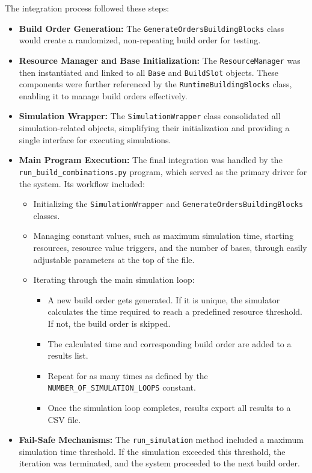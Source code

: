 \documentclass[a4paper, 12pt, english]{article}
\begin{document}
The integration process followed these steps:
\begin{itemize}
    \item \textbf{Build Order Generation:} The \texttt{GenerateOrdersBuildingBlocks} class would create a randomized, non-repeating build order for testing.
    \item \textbf{Resource Manager and Base Initialization:} The \texttt{ResourceManager} was then instantiated and linked to all \texttt{Base} and \texttt{BuildSlot} objects. These components were further referenced by the \texttt{RuntimeBuildingBlocks} class, enabling it to manage build orders effectively.
    \item \textbf{Simulation Wrapper:} The \texttt{SimulationWrapper} class consolidated all simulation-related objects, simplifying their initialization and providing a single interface for executing simulations.
    \item \textbf{Main Program Execution:} The final integration was handled by the \texttt{run\_build\_combinations.py} program, which served as the primary driver for the system. Its workflow included:
        \begin{itemize}
            \item Initializing the \texttt{SimulationWrapper} and \texttt{GenerateOrdersBuildingBlocks} classes.
            \item Managing constant values, such as maximum simulation time, starting resources, resource value triggers, and the number of bases, through easily adjustable parameters at the top of the file.
            \item Iterating through the main simulation loop:
                \begin{itemize}
                    \item A new build order gets generated. If it is unique, the simulator calculates the time required to reach a predefined resource threshold. If not, the build order is skipped.
                    \item The calculated time and corresponding build order are added to a results list.
                    \item Repeat for as many times as defined by the \texttt{NUMBER\_OF\_SIMULATION\_LOOPS} constant.
                    \item Once the simulation loop completes, results export all results to a CSV file.
                \end{itemize}
        \end{itemize}
    \item \textbf{Fail-Safe Mechanisms:} The \texttt{run\_simulation} method included a maximum simulation time threshold. If the simulation exceeded this threshold, the iteration was terminated, and the system proceeded to the next build order.
\end{itemize}
\end{document}
